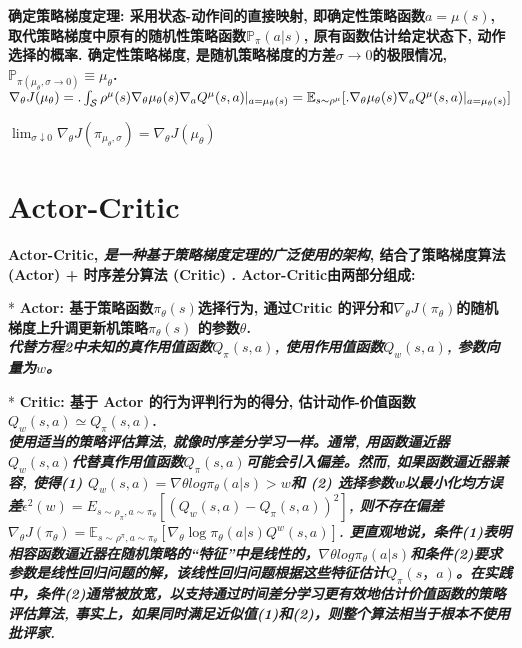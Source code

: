         \bf{确定策略梯度定理}: 采用状态-动作间的直接映射, 即确定性策略函数$a = \mu(s)$,  取代策略梯度中原有的随机性策略函数$\mathbb P_\pi(a|s)$, 原有函数估计给定状态下, 动作选择的概率. 确定性策略梯度, 是随机策略梯度的方差$\sigma \to 0$的极限情况, $\mathbb P_{\pi(\mu_\theta, \sigma \to 0)} \equiv \mu_\theta$. 
            $\nabla_{\theta} J (\mu_{\theta} ) = .\int_{\mathcal{S}} \rho^{\mu}(s) \nabla_{\theta} \mu_{\theta}(s) \nabla_{a} Q^{\mu}(s, a) |_{a=\mu_{\theta}(s)} \\=\mathbb{E}_{s \sim \rho^{\mu}} [ .\nabla_{\theta} \mu_{\theta}(s) \nabla_{a} Q^{\mu}(s, a) |_{a=\mu_{\theta}(s)} ]$ 
            
            $\lim _{\sigma \downarrow 0} \nabla_{\theta} J (\pi_{\mu_{\theta}, \sigma} )=\nabla_{\theta} J (\mu_{\theta} )$

    \section{Actor-Critic}
        \bf{Actor-Critic}, \textit{是一种基于策略梯度定理的广泛使用的架构}, 结合了策略梯度算法 (Actor) + 时序差分算法 (Critic) . Actor-Critic由两部分组成:
    
            * \bf{Actor}: 基于策略函数$\pi_\theta(s)$选择行为, 通过Critic 的评分和$\nabla_{\theta} J (\pi_{\theta} )$的随机梯度上升调更新机策略$\pi_\theta(s)$ 的参数$\theta$. \\ \textit{代替方程2中未知的真作用值函数$Q_\pi (s, a)$, 使用作用值函数$Q_w (s, a)$, 参数向量为$w$。}
            
            * \bf{Critic}: 基于 Actor 的行为评判行为的得分, 估计动作-价值函数$Q_w (s, a) \simeq  Q_\pi (s, a)$. \\ \textit{使用适当的策略评估算法, 就像时序差分学习一样。通常, 用函数逼近器$Q_w (s, a)$代替真作用值函数$Q_\pi (s, a)$可能会引入偏差。然而, 如果函数逼近器兼容, 使得(1) $Q_w (s, a) = \nabla \theta log \pi_\theta (a | s)>w$和 (2) 选择参数w以最小化均方误差$\epsilon^2 (w)=E_{s \sim \rho_\pi, a \sim \pi_\theta} [ (Q_w (s, a)− Q_\pi (s, a))^2]$, 则不存在偏差$\nabla_{\theta} J (\pi_{\theta} )=\mathbb{E}_{s \sim \rho^{\pi}, a \sim \pi_{\theta}} [\nabla_{\theta} \log \pi_{\theta}(a | s) Q^{w}(s, a) ]$. 更直观地说，条件(1)表明相容函数逼近器在随机策略的“特征”中是线性的，$\nabla \theta log \pi_\theta (a | s)$和条件(2)要求参数是线性回归问题的解，该线性回归问题根据这些特征估计$Q_\pi(s，a)$。在实践中，条件(2)通常被放宽，以支持通过时间差分学习更有效地估计价值函数的策略评估算法, 事实上，如果同时满足近似值(1)和(2)，则整个算法相当于根本不使用批评家. }

